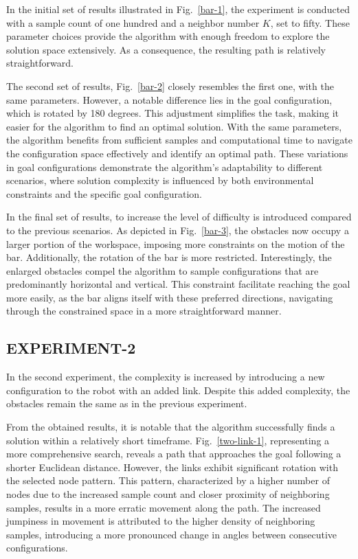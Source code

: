 \documentclass{IEEEtaes}
\begin{document}
In the initial set of results illustrated in Fig.~\ref{bar-1}, the experiment is conducted with a sample count of one hundred and a neighbor number $K$, set to fifty. These parameter choices provide the algorithm with enough freedom to explore the solution space extensively. As a consequence, the resulting path is relatively straightforward.

The second set of results, Fig.~\ref{bar-2} closely resembles the first one, with the same parameters. However, a notable difference lies in the goal configuration, which is rotated by 180 degrees. This adjustment simplifies the task, making it easier for the algorithm to find an optimal solution. With the same parameters, the algorithm benefits from sufficient samples and computational time to navigate the configuration space effectively and identify an optimal path. These variations in goal configurations demonstrate the algorithm's adaptability to different scenarios, where solution complexity is influenced by both environmental constraints and the specific goal configuration.

In the final set of results, to increase the level of difficulty is introduced compared to the previous scenarios. As depicted in Fig.~\ref{bar-3}, the obstacles now occupy a larger portion of the workspace, imposing more constraints on the motion of the bar. Additionally, the rotation of the bar is more restricted. Interestingly, the enlarged obstacles compel the algorithm to sample configurations that are predominantly horizontal and vertical. This constraint facilitate reaching the goal more easily, as the bar aligns itself with these preferred directions, navigating through the constrained space in a more straightforward manner. 
\subsection{\fontsize{10}{13}\selectfont EXPERIMENT-2}
In the second experiment, the complexity is increased by introducing a new configuration to the robot with an added link. Despite this added complexity, the obstacles remain the same as in the previous experiment.

From the obtained results, it is notable that the algorithm successfully finds a solution within a relatively short timeframe. Fig.~\ref{two-link-1}, representing a more comprehensive search, reveals a path that approaches the goal following a shorter Euclidean distance. However, the links exhibit significant rotation with the selected node pattern. This pattern, characterized by a higher number of nodes due to the increased sample count and closer proximity of neighboring samples, results in a more erratic movement along the path. The increased jumpiness in movement is attributed to the higher density of neighboring samples, introducing a more pronounced change in angles between consecutive configurations.
\end{document}

